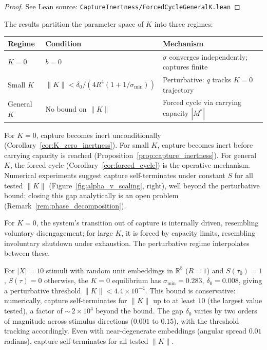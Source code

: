 \begin{proof}
\leanok
{}
See Lean source: \texttt{CaptureInertness/ForcedCycleGeneralK.lean}
\end{proof}

\begin{remark}[$K$-spectrum]
\label{rem:K_spectrum}
\leanok
{}
The results partition the parameter space of $K$ into three regimes:
\begin{center}
\begin{tabular}{@{}lll@{}}
\toprule
\textbf{Regime} & \textbf{Condition} & \textbf{Mechanism} \\
\midrule
$K = 0$ & $b = 0$ & $\sigma$ converges independently; captures finite \\
Small $K$ & $\|K\| < \delta_0/(4R^4(1 + 1/\sigma_{\min}))$ & Perturbative: $q$ tracks $K{=}0$ trajectory \\
General $K$ & No bound on $\|K\|$ & Forced cycle via carrying capacity $|M^*|$ \\
\bottomrule
\end{tabular}
\end{center}

For $K = 0$, capture becomes inert unconditionally (Corollary~\ref{cor:K_zero_inertness}).  For small $K$, capture becomes inert before carrying capacity is reached (Proposition~\ref{prop:capture_inertness}).  For general $K$, the forced cycle (Corollary~\ref{cor:forced_cycle}) is the operative mechanism.  Numerical experiments suggest capture self-terminates under constant $S$ for all tested $\|K\|$ (Figure~\ref{fig:alpha_v_scaling}, right), well beyond the perturbative bound; closing this gap analytically is an open problem (Remark~\ref{rem:phase_decomposition}).

For $K = 0$, the system's transition out of capture is internally driven, resembling voluntary disengagement; for large $K$, it is forced by capacity limits, resembling involuntary shutdown under exhaustion.  The perturbative regime interpolates between these.
\end{remark}

\begin{remark}
\label{rem:threshold}
\leanok
{}
For $|X| = 10$ stimuli with random unit embeddings in $\mathbb{R}^8$ ($R = 1$) and $S(\tau_0) = 1$, $S(\tau) = 0$ otherwise, the $K = 0$ equilibrium has $\sigma_{\min} = 0.283$, $\delta_0 = 0.008$, giving a perturbative threshold $\|K\| < 4.4 \times 10^{-4}$.  This bound is conservative: numerically, capture self-terminates for $\|K\|$ up to at least $10$ (the largest value tested), a factor of ${\sim}\,2 \times 10^4$ beyond the bound.  The gap $\delta_0$ varies by two orders of magnitude across stimulus directions ($0.001$ to $0.15$), with the threshold tracking accordingly.  Even with near-degenerate embeddings (angular spread $0.01$ radians), capture self-terminates for all tested $\|K\|$.
\end{remark}


